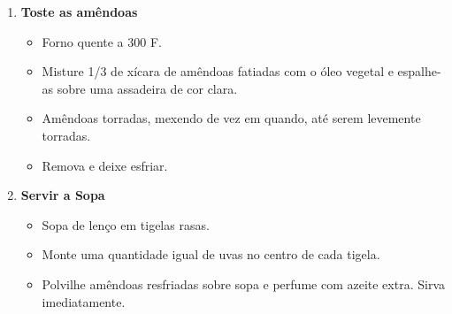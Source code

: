 \documentclass [11pt, letterpaper] {article}
\begin{document}
\begin {description}
\begin {enumerate}
\item {\bf Toste as am\^endoas}
\begin {itemize}
\item Forno quente a 300 F.
\item Misture 1/3 de xícara de amêndoas fatiadas com o óleo vegetal e espalhe-as sobre uma assadeira de cor clara.
\item Amêndoas torradas, mexendo de vez em quando, até serem levemente torradas.
\item Remova e deixe esfriar.
\end {itemize}

\item {\bf Servir a Sopa}
\begin {itemize}
\item Sopa de lenço em tigelas rasas.
\item Monte uma quantidade igual de uvas no centro de cada tigela.
\item Polvilhe amêndoas resfriadas sobre sopa e perfume com azeite extra. Sirva imediatamente.
\end {itemize}

\end {enumerate}
\end {description}
\end{document}
